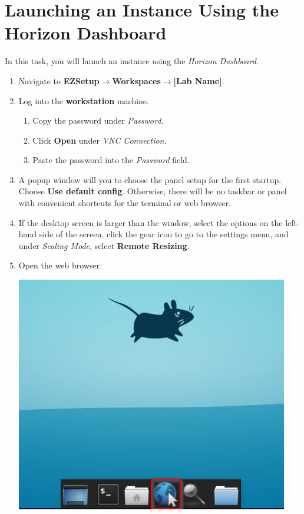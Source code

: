 \documentclass[letterpaper, 12pt]{article}
\begin{document}
\section{Launching an Instance Using the Horizon Dashboard}
In this task, you will launch an instance using the \textit{Horizon Dashboard}.

\begin{enumerate}
    \item Navigate to \textbf{EZSetup$\rightarrow$Workspaces$\rightarrow$[Lab Name]}.
    
    \item Log into the \textbf{workstation} machine.
    \begin{enumerate}
        \item Copy the password under \textit{Password}.
        \item Click \textbf{Open} under \textit{VNC Connection}.
        \item Paste the password into the \textit{Password} field.
    \end{enumerate}

    \item A popup window will you to choose the panel setup for the first startup. Choose \textbf{Use default config}.
    Otherwise, there will be no taskbar or panel with convenient shortcuts for the terminal or web browser.

    \item If the desktop screen is larger than the window, select the options on the left-hand side of the screen,
    click the gear icon to go to the settings menu, and under \textit{Scaling Mode}, select \textbf{Remote Resizing}.

    \item Open the web browser.

    \begin{center}
    \includegraphics[scale=0.75]{images/part_1_step_5.png}
    \end{center}


\end{enumerate}
\end{document}
